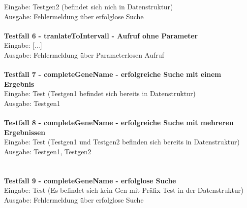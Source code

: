 Eingabe: Testgen2 (befindet sich nich in Datenstruktur)\\
Ausgabe: Fehlermeldung über erfolglose Suche\\
\\
\textbf{Testfall 6 - tranlateToIntervall - Aufruf ohne Parameter}\\
Eingabe: [...]\\
Ausgabe: Fehlermeldung über Parameterlosen Aufruf\\
\\
\textbf{Testfall 7 - completeGeneName - erfolgreiche Suche mit einem Ergebnis}\\
Eingabe: Test (Testgen1 befindet sich bereits in Datenstruktur)\\
Ausgabe: Testgen1\\
\\
\textbf{Testfall 8 - completeGeneName - erfolgreiche Suche mit mehreren Ergebnissen}\\
Eingabe: Test (Testgen1 und Testgen2 befinden sich bereits in Datenstruktur)\\
Ausgabe: Testgen1, Testgen2\\
\\
\newpage\hfill\\
\textbf{Testfall 9 - completeGeneName - erfolglose Suche}\\
Eingabe: Test (Es befindet sich kein Gen mit Präfix Test in der Datenstruktur)\\
Ausgabe: Fehlermeldung über erfolglose Suche
